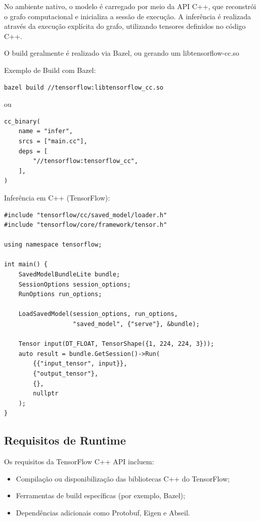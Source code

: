No ambiente nativo, o modelo é carregado por meio da API C++, que reconstrói o grafo
computacional e inicializa a sessão de execução. A inferência é realizada através da
execução explícita do grafo, utilizando tensores definidos no código C++.

O build geralmente é realizado via Bazel, ou gerando um libtensorflow-cc.so

Exemplo de Build com Bazel:

\begin{verbatim}
bazel build //tensorflow:libtensorflow_cc.so
\end{verbatim}

ou 

\begin{verbatim}
cc_binary(
    name = "infer",
    srcs = ["main.cc"],
    deps = [
        "//tensorflow:tensorflow_cc",
    ],
)
\end{verbatim}

Inferência em C++ (TensorFlow):
\begin{verbatim}
#include "tensorflow/cc/saved_model/loader.h"
#include "tensorflow/core/framework/tensor.h"

using namespace tensorflow;

int main() {
    SavedModelBundleLite bundle;
    SessionOptions session_options;
    RunOptions run_options;

    LoadSavedModel(session_options, run_options,
                   "saved_model", {"serve"}, &bundle);

    Tensor input(DT_FLOAT, TensorShape({1, 224, 224, 3}));
    auto result = bundle.GetSession()->Run(
        {{"input_tensor", input}},
        {"output_tensor"},
        {},
        nullptr
    );
}
\end{verbatim}



\subsection{Requisitos de Runtime}

Os requisitos da TensorFlow C++ API incluem:
\begin{itemize}
    \item Compilação ou disponibilização das bibliotecas C++ do TensorFlow;
    \item Ferramentas de build específicas (por exemplo, Bazel);
    \item Dependências adicionais como Protobuf, Eigen e Abseil.
\end{itemize}


